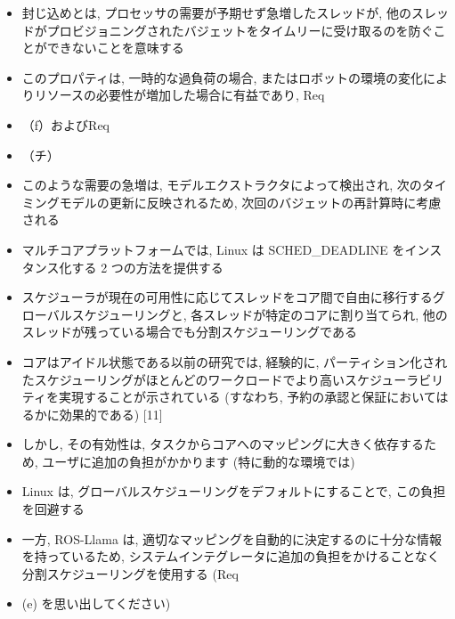 \begin{frame}{}
    \begin{itemize}
        \item 封じ込めとは, プロセッサの需要が予期せず急増したスレッドが, 他のスレッドがプロビジョニングされたバジェットをタイムリーに受け取るのを防ぐことができないことを意味する
\item このプロパティは, 一時的な過負荷の場合, またはロボットの環境の変化によりリソースの必要性が増加した場合に有益であり, Req
\item （f）およびReq
\item （チ）
\item このような需要の急増は, モデルエクストラクタによって検出され, 次のタイミングモデルの更新に反映されるため, 次回のバジェットの再計算時に考慮される
    \end{itemize}
\end{frame}

\begin{frame}{}
    \begin{itemize}
        \item マルチコアプラットフォームでは, Linux は SCHED\_DEADLINE をインスタンス化する 2 つの方法を提供する
\item スケジューラが現在の可用性に応じてスレッドをコア間で自由に移行するグローバルスケジューリングと, 各スレッドが特定のコアに割り当てられ, 他のスレッドが残っている場合でも分割スケジューリングである
\item コアはアイドル状態である以前の研究では, 経験的に, パーティション化されたスケジューリングがほとんどのワークロードでより高いスケジューラビリティを実現することが示されている (すなわち, 予約の承認と保証においてはるかに効果的である) [11]
    \end{itemize}
\end{frame}

\begin{frame}{}
    \begin{itemize}
        \item しかし, その有効性は, タスクからコアへのマッピングに大きく依存するため, ユーザに追加の負担がかかります (特に動的な環境では)
\item Linux は, グローバルスケジューリングをデフォルトにすることで, この負担を回避する
\item 一方, ROS-Llama は, 適切なマッピングを自動的に決定するのに十分な情報を持っているため, システムインテグレータに追加の負担をかけることなく分割スケジューリングを使用する (Req
\item (e) を思い出してください)
    \end{itemize}
\end{frame}

